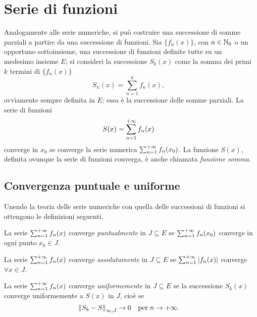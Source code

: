 \chapter{Serie di funzioni}
Analogamente alle serie numeriche, si può costruire una successione di somme parziali a partire da una successione di funzioni. Sia $\{f_n(x)\}$, con $n\in\mathbb{N}_0$ o un opportuno sottoinsieme, una successione di funzioni definite tutte su un medesimo insieme $E$; si consideri la successione $S_k(x)$ come la somma dei primi $k$ termini di $\{f_n(x)\}$
\[
S_n(x)=\sum_{n=1}^kf_n(x),
\]
ovviamente sempre definita in $E$: essa è la successione delle somme parziali.
La serie di funzioni
\[
S(x)=\sum_{{n}=1}^{+\infty}f_n(x)
\]
converge in $x_0$ se converge la serie numerica $\sum_{{n}=1}^{+\infty}f_n(x_0)$. La funzione $S(x)$, definita ovunque la serie di funzioni converga, è anche chiamata \emph{funzione somma}.

\section{Convergenza puntuale e uniforme}
Unendo la teoria delle serie numeriche con quella delle successioni di funzioni si ottengono le definizioni seguenti.
\begin{definizione}
La serie $\sum_{{n}=1}^{+\infty}f_n(x)$ converge \emph{puntualmente} in $J\subseteq E$ se $\sum_{{n}=1}^{+\infty}f_n(x_0)$ converge in ogni punto $x_0\in J$.
\end{definizione}
\begin{definizione}
La serie $\sum_{{n}=1}^{+\infty}f_n(x)$ converge \emph{assolutamente} in $J\subseteq E$ se $\sum_{{n}=1}^{+\infty}\left|{f_n(x)}\right|$ converge $\forall x\in J$.
\end{definizione}
\begin{definizione}
La serie $\sum_{{n}=1}^{+\infty}f_n(x)$ converge \emph{uniformemente} in $J\subseteq E$ se la successione $S_k(x)$ converge uniformemente a $S(x)$ in $J$, cioè se
\[
\left\|{S_k-S}\right\|_{\infty,J}\to 0\quad\text{per }n\to+\infty.
\]
\end{definizione}

